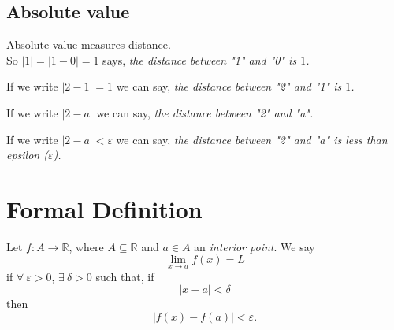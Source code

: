 \documentclass[20pt]{extarticle}
\newcommand{\abs}[1]{\left|#1\right|}
\newcommand{\R}{\mathbb{R}}
\begin{document}



\subsection*{\textbf{\color{draculaorange}Absolute value}}

Absolute value measures distance.\\

So \(\abs{1}=\abs{1-0}=1\) says, \textit{\color{draculayellow}the distance between "1" and "0"
is \(1\).}

If we write \(\abs{2-1}=1\) we can say, \textit{\color{draculayellow}the distance between "2" and "1"
is \(1\).}

If we write \(\abs{2-a}\) we can say, \textit{\color{draculayellow}the distance between "2" and "a".}


If we write \(\abs{2-a}<\varepsilon\) we can say, \textit{\color{draculayellow}the distance between "2" and "a" is less than epsilon (\(\varepsilon\)).}


\newpage
\section*{\textbf{\color{draculaorange}Formal Definition}}

Let \(f:A\to \R\),  where \(A\subseteq \R\) and \(a\in A\) an
\textit{\color{draculapink}interior point}. We say
\[\lim_{x\to a} f(x)=L\]
if \(\forall\ \varepsilon>0\), \(\exists\ \delta>0\) such that, if
\[\abs{x-a}<\delta\]
then
\[\abs{f(x)-f(a)}<\varepsilon.\]
\end{document}
